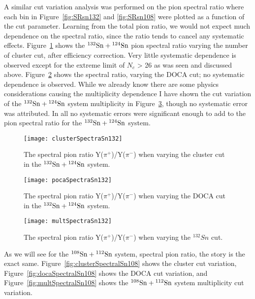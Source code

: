 A similar cut variation analysis was performed on the pion spectral ratio where each bin in Figure~\ref{fig:SRsn132} and \ref{fig:SRsn108} were plotted as a function of the cut parameter. Learning from the total pion ratio, we would not expect much dependence on the spectral ratio, since the ratio tends to cancel any systematic effects. Figure~\ref{fig:clusterSpectralSn132} shows the ${}^{132}\mathrm{Sn} + {}^{124}\mathrm{Sn}$ pion spectral ratio varying the number of cluster cut, after efficiency correction. Very little systematic dependence is observed except for the extreme limit of $N_c$ > 26 as was seen and discussed above. Figure~\ref{fig:docaSpectralSn132} shows the spectral ratio, varying the DOCA cut; no systematic dependence is observed. While we already know there are some physics considerations causing the multiplicity dependence I have shown the cut variation of the ${}^{132}\mathrm{Sn} + {}^{124}\mathrm{Sn}$ system multiplicity in Figure~\ref{fig:multSpectralSn132}, though no systematic error was attributed. In all no systematic errors were significant enough to add to the pion spectral ratio for the ${}^{132}\mathrm{Sn} + {}^{124}\mathrm{Sn}$ system. 




\begin{figure}[!htb]
	\centering
    \texttt{[image: clusterSpectraSn132]}
	\caption{The spectral pion ratio Y($\pi^+$)/Y($\pi^-$) when varying the cluster cut in the ${}^{132}\mathrm{Sn} + {}^{124}\mathrm{Sn}$ system.}
	\label{fig:clusterSpectralSn132}
\end{figure}


\begin{figure}[!htb]
	\centering
    \texttt{[image: pocaSpectraSn132]}
	\caption{The spectral pion ratio Y($\pi^+$)/Y($\pi^-$) when varying the DOCA cut in the ${}^{132}\mathrm{Sn} + {}^{124}\mathrm{Sn}$ system.}
	\label{fig:docaSpectralSn132}
\end{figure}


\begin{figure}[!htb]
	\centering
    \texttt{[image: multSpectraSn132]}
	\caption{The spectral pion ratio Y($\pi^+$)/Y($\pi^-$) when varying the ${}^{132}Sn$ cut.}
	\label{fig:multSpectralSn132}
\end{figure}



As we will see for the ${}^{108}\mathrm{Sn} + {}^{112}\mathrm{Sn}$ system, spectral pion ratio, the story is the exact same. Figure~\ref{fig:clusterSpectralSn108} shows the cluster cut variation, Figure~\ref{fig:docaSpectralSn108} shows the DOCA cut variation, and Figure~\ref{fig:multSpectralSn108} shows the ${}^{108}\mathrm{Sn} + {}^{112}\mathrm{Sn}$ system multiplicity cut variation.





